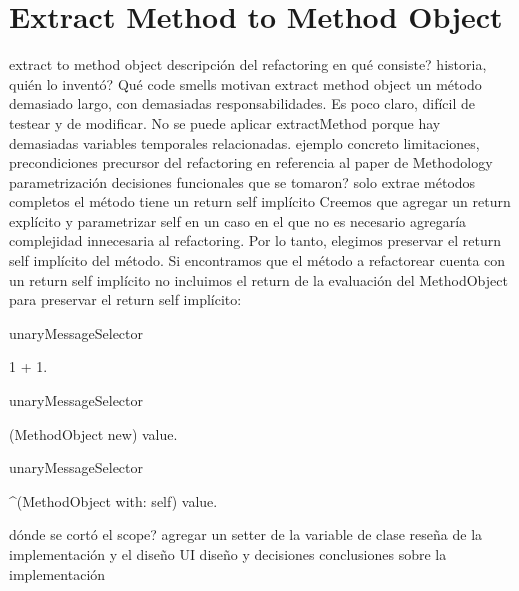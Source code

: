 \section{Extract Method to Method Object}

extract to method object
    descripción del refactoring
        en qué consiste?
        historia, quién lo inventó?
        Qué code smells motivan extract method object
        un método demasiado largo, con demasiadas responsabilidades. Es poco claro, difícil de testear y de modificar. No se puede aplicar extractMethod porque hay demasiadas variables temporales relacionadas.
    ejemplo concreto
    limitaciones, precondiciones
        precursor del refactoring en referencia al paper de Methodology
    parametrización
    decisiones funcionales que se tomaron?
        solo extrae métodos completos
        el método tiene un return self implícito
        Creemos que agregar un return explícito y parametrizar self en un caso en el que no es necesario agregaría complejidad innecesaria al refactoring. Por lo tanto, elegimos preservar el return self implícito del método. Si encontramos que el método a refactorear cuenta con un return self implícito no incluimos el return de la evaluación del MethodObject para preservar el return self implícito:

\begin{code}

unaryMessageSelector

 1 + 1.

unaryMessageSelector
 
 (MethodObject new) value.

unaryMessageSelector

 ^(MethodObject with: self) value.

\end{code}

    dónde se cortó el scope?
        agregar un setter de la variable de clase
    reseña de la implementación y el diseño
    UI diseño y decisiones
    conclusiones sobre la implementación